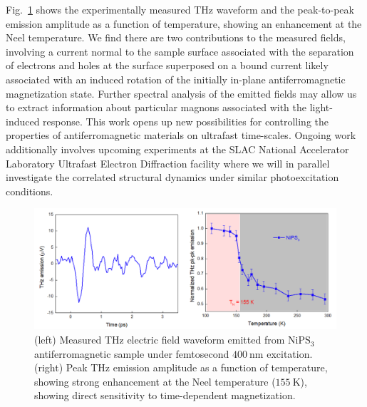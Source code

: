 Fig.~\ref{fig:NiPS3} shows the experimentally measured THz waveform and the peak-to-peak emission amplitude as a function of temperature, showing an enhancement at the Neel temperature.
We find there are two contributions to the measured fields, involving a current normal to the sample surface associated with the separation of electrons and holes at the surface superposed on a bound current likely associated with an induced rotation of the initially in-plane antiferromagnetic magnetization state.
Further spectral analysis of the emitted fields may allow us to extract information about particular magnons associated with the light-induced response.
This work opens up new possibilities for controlling the properties of antiferromagnetic materials on ultrafast time-scales. 
Ongoing work additionally involves upcoming experiments at the SLAC National Accelerator Laboratory Ultrafast Electron Diffraction facility where we will in parallel investigate the correlated structural dynamics under similar photoexcitation conditions.

\begin{figure}[ht]
	\centering\includegraphics[width=0.8\linewidth]{figures/NiPS3}
	\caption{
		(left)  Measured THz electric field waveform emitted from \(\mathrm{NiPS_3}\) antiferromagnetic sample under femtosecond \(400~\mathrm{nm}\) excitation.
		(right) Peak THz emission amplitude as a function of temperature, showing strong enhancement at the Neel temperature (\(155~\mathrm{K}\)), showing direct sensitivity to time-dependent magnetization.
	}
	\label{fig:NiPS3}
\end{figure}

